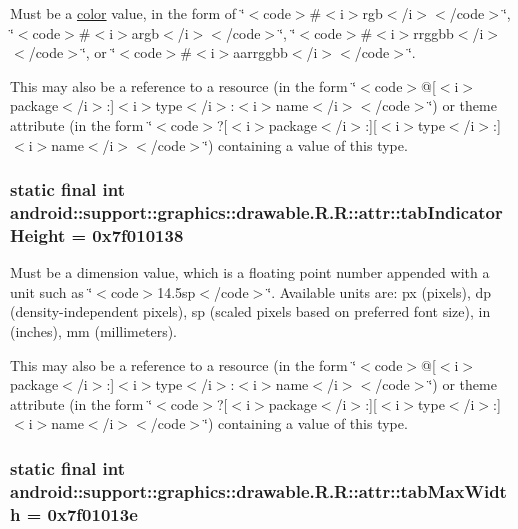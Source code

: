 Must be a \hyperlink{classandroid_1_1support_1_1graphics_1_1drawable_1_1_r_1_1color}{color} value, in the form of \char`\"{}$<$code$>$\#$<$i$>$rgb$<$/i$>$$<$/code$>$\char`\"{}, \char`\"{}$<$code$>$\#$<$i$>$argb$<$/i$>$$<$/code$>$\char`\"{}, \char`\"{}$<$code$>$\#$<$i$>$rrggbb$<$/i$>$$<$/code$>$\char`\"{}, or \char`\"{}$<$code$>$\#$<$i$>$aarrggbb$<$/i$>$$<$/code$>$\char`\"{}. 

This may also be a reference to a resource (in the form \char`\"{}$<$code$>$@\mbox{[}$<$i$>$package$<$/i$>$:\mbox{]}$<$i$>$type$<$/i$>$:$<$i$>$name$<$/i$>$$<$/code$>$\char`\"{}) or theme attribute (in the form \char`\"{}$<$code$>$?\mbox{[}$<$i$>$package$<$/i$>$:\mbox{]}\mbox{[}$<$i$>$type$<$/i$>$:\mbox{]}$<$i$>$name$<$/i$>$$<$/code$>$\char`\"{}) containing a value of this type. \hypertarget{classandroid_1_1support_1_1graphics_1_1drawable_1_1_r_1_1attr_34901eedf01bbdb2df0c26af32c8b3f1}{
\subsubsection[{tabIndicatorHeight}]{\setlength{\rightskip}{0pt plus 5cm}static final int android::support::graphics::drawable.R.R::attr::tabIndicatorHeight = 0x7f010138}}
\label{classandroid_1_1support_1_1graphics_1_1drawable_1_1_r_1_1attr_34901eedf01bbdb2df0c26af32c8b3f1}


Must be a dimension value, which is a floating point number appended with a unit such as \char`\"{}$<$code$>$14.5sp$<$/code$>$\char`\"{}. Available units are: px (pixels), dp (density-independent pixels), sp (scaled pixels based on preferred font size), in (inches), mm (millimeters). 

This may also be a reference to a resource (in the form \char`\"{}$<$code$>$@\mbox{[}$<$i$>$package$<$/i$>$:\mbox{]}$<$i$>$type$<$/i$>$:$<$i$>$name$<$/i$>$$<$/code$>$\char`\"{}) or theme attribute (in the form \char`\"{}$<$code$>$?\mbox{[}$<$i$>$package$<$/i$>$:\mbox{]}\mbox{[}$<$i$>$type$<$/i$>$:\mbox{]}$<$i$>$name$<$/i$>$$<$/code$>$\char`\"{}) containing a value of this type. \hypertarget{classandroid_1_1support_1_1graphics_1_1drawable_1_1_r_1_1attr_9dd293e2ce5286f0e0eb6de6151a594e}{
\subsubsection[{tabMaxWidth}]{\setlength{\rightskip}{0pt plus 5cm}static final int android::support::graphics::drawable.R.R::attr::tabMaxWidth = 0x7f01013e}}
\label{classandroid_1_1support_1_1graphics_1_1drawable_1_1_r_1_1attr_9dd293e2ce5286f0e0eb6de6151a594e}


